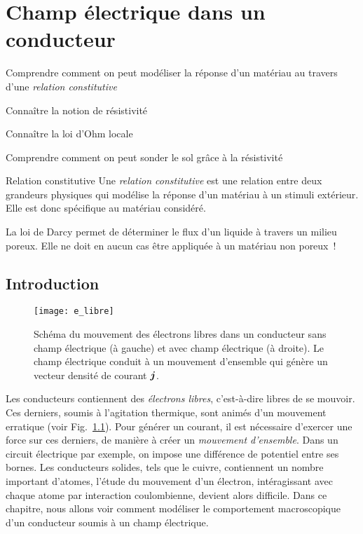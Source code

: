 \chapter{Champ électrique dans un conducteur}
\label{chap:metaux}
\begin{objectif}
	\item Comprendre comment on peut modéliser la réponse 
		d'un matériau au travers d'une \emph{relation constitutive}
	\item Connaître la notion de résistivité
	\item Connaître la loi d'Ohm locale
	\item Comprendre comment on peut sonder le sol grâce à la résistivité
\end{objectif}

\begin{defn}{Relation constitutive}
	Une \emph{relation constitutive} est une relation entre deux grandeurs
	physiques qui modélise la réponse d'un matériau à un stimuli extérieur.
	Elle est donc spécifique au matériau considéré.
\end{defn}

\begin{exemple}
	La loi de Darcy permet de déterminer le flux d'un liquide à travers 
	un milieu poreux. Elle ne doit en aucun cas être appliquée à un matériau
	non poreux~!
\end{exemple}
\section*{Introduction}
\begin{figure}[]
	\centering
	\texttt{[image: e\_libre]}
	\caption{Schéma du mouvement des électrons libres dans un conducteur
		 sans champ électrique (à gauche) et avec champ électrique 
	 	 (à droite). Le champ électrique conduit à un mouvement 
	 	d'ensemble qui génère un vecteur densité de courant $\mitbf{j}$.}%
	\label{fig:e_libre}
\end{figure}

Les conducteurs contiennent des \emph{électrons libres}, c'est-à-dire libres de se 
mouvoir. Ces derniers, soumis à l'agitation thermique, sont animés d'un mouvement
erratique (voir Fig.~\ref{fig:e_libre}). 
Pour générer un courant, il est nécessaire
d'exercer une force sur ces derniers, de manière à créer un \emph{mouvement d'ensemble}.
Dans un circuit électrique par exemple, on impose une différence de potentiel 
entre ses bornes. Les conducteurs solides, tels que le cuivre, contiennent
un nombre important d'atomes, l'étude du mouvement d'un électron, intéragissant
avec chaque atome par interaction coulombienne, devient alors 
difficile.
Dans ce chapitre, nous allons voir comment modéliser le comportement macroscopique 
d'un conducteur soumis à un champ électrique.
